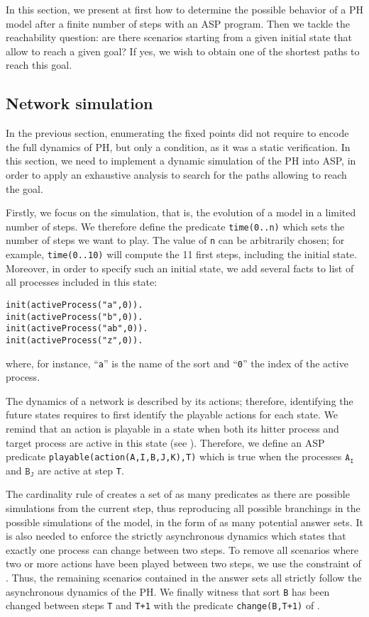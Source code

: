 
In this section, we present at first how to determine the possible behavior of a PH model after a finite number of steps with an ASP program.
Then we tackle the reachability question: are there scenarios starting from a given initial state
that allow to reach a given goal? If yes, we wish to obtain one of the shortest paths to reach this goal.

\subsection{Network simulation}
In the previous section, enumerating the fixed points did not require to
encode the full dynamics of PH, but only a condition, as it was a static verification.
In this section, we need to implement a dynamic simulation of the PH into ASP, in order to apply an exhaustive analysis to search for the paths allowing to reach the goal.

Firstly, we focus on the simulation, that is, the evolution of a model in a limited number of steps.
We therefore define the predicate \texttt{time(0..n)} which sets the number of steps we want to play.
The value of \texttt{n} can be arbitrarily chosen;
for example, \texttt{time(0..10)} will compute the 11 first steps,
including the initial state.
Moreover, in order to specify such an initial state, we add several facts
to list of all processes included in this state:
\begin{lstlisting}
init(activeProcess("a",0)).
init(activeProcess("b",0)).
init(activeProcess("ab",0)).
init(activeProcess("z",0)).
\end{lstlisting}
where, for instance, ``\texttt{a}'' is the name of the sort and ``\texttt{0}'' the index of the active process.

The dynamics of a network is described by its actions;
therefore, identifying the future states requires to first identify the playable actions for each state.
We remind that an action is playable in a state when both its hitter process and target process are active in this state (see ).
Therefore, we define an ASP predicate \texttt{playable(action(A,I,B,J,K),T)} which is true
when the processes $\texttt{A}_\texttt{I}$ and $\texttt{B}_\texttt{J}$ are active at step \texttt{T}.

The cardinality rule of 
creates a set of as many predicates as there are possible simulations from the current step,
thus reproducing all possible branchings in the possible simulations of the model, in the form of as many potential answer sets. It is also needed to enforce the strictly asynchronous dynamics
which states that exactly one process can change between two steps.
To remove all scenarios where two or more actions have been played between
two steps, we use the constraint of .
Thus, the remaining scenarios contained in the answer sets all strictly follow
the asynchronous dynamics of the PH.
We finally witness that sort \texttt{B} has been changed between steps \texttt{T} and \texttt{T+1} with the predicate \texttt{change(B,T+1)} of .

